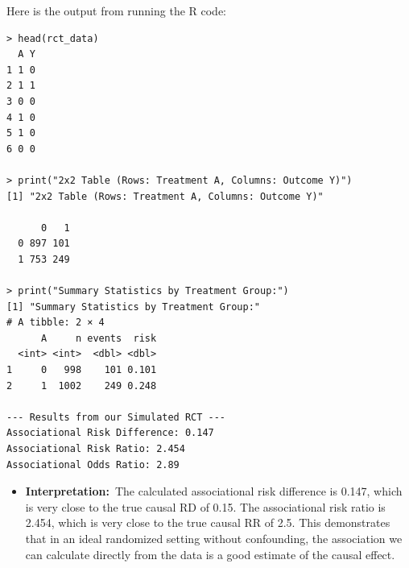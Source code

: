 \documentclass[
  10pt,
  letterpaper,
  DIV=11,
  numbers=noendperiod]{scrartcl}
\providecommand{\tightlist}{%
  \setlength{\itemsep}{0pt}\setlength{\parskip}{0pt}}
\begin{document}
Here is the output from running the R code:

\begin{verbatim}
> head(rct_data)
  A Y
1 1 0
2 1 1
3 0 0
4 1 0
5 1 0
6 0 0

> print("2x2 Table (Rows: Treatment A, Columns: Outcome Y)")
[1] "2x2 Table (Rows: Treatment A, Columns: Outcome Y)"
   
      0   1
  0 897 101
  1 753 249

> print("Summary Statistics by Treatment Group:")
[1] "Summary Statistics by Treatment Group:"
# A tibble: 2 × 4
      A     n events  risk
  <int> <int>  <dbl> <dbl>
1     0   998    101 0.101
2     1  1002    249 0.248

--- Results from our Simulated RCT ---
Associational Risk Difference: 0.147 
Associational Risk Ratio: 2.454 
Associational Odds Ratio: 2.89 
\end{verbatim}

\begin{itemize}
\tightlist
\item
  \textbf{Interpretation:}~The calculated associational risk difference
  is 0.147, which is very close to the true causal RD of 0.15. The
  associational risk ratio is 2.454, which is very close to the true
  causal RR of 2.5. This demonstrates that in an ideal randomized
  setting without confounding, the association we can calculate directly
  from the data is a good estimate of the causal effect.
\end{itemize}
\end{document}
